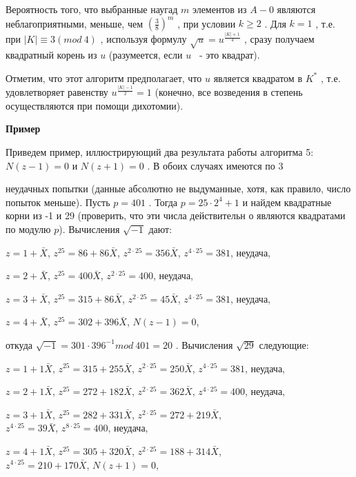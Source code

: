 Вероятность того, что выбранные наугад $m$
 элементов из $A - {0}$
 являются неблагоприятными, меньше, чем $(\frac 38)^m$
 , при условии $k\geqslant 2$
. Для $k = 1$
, т.е. при $|K|\equiv 3 (mod \ 4)$
, используя формулу $\sqrt u = u^{\frac{|K|+1}{4}}$
, сразу получаем квадратный корень из $u$
 (разумеется, если $u$
 ~- это квадрат).

Отметим, что этот алгоритм предполагает, что $u$
 является квадратом в $K^*$
 , т.е. удовлетворяет равенству $u^{\frac{|K|-1}{2}} = 1$
 (конечно, все возведения в степень осуществляются при помощи дихотомии).


{\bf Пример}

Приведем пример, иллюстрирующий два результата работы алгоритма 5: $N(z-1)=0$ и $N(z+1)=0$
. В обоих случаях имеются по 3

\newpage

неудачных попытки (данные абсолютно не выдуманные, хотя, как правило, число попыток меньше). Пусть $p = 401$
. Тогда $p = 25\cdot 2^4 +1$
 и найдем квадратные корни из -1 и 29 (проверить, что эти числа действительн о являются квадратами по модулю $p$). Вычисления $\sqrt{-1}$
 дают:

\begin{center}
$z = 1 +\bar X$, $z^{25}=86+86\bar X$, $z^{2\cdot 25}=356\bar X$,
$z^{4\cdot 25}=381$, неудача,

$z = 2+\bar X$, $z^{25}=400\bar X$, $z^{2\cdot 25}=400$, неудача,

$z = 3+\bar X$, $z^{25}=315+86\bar X$, $z^{2\cdot 25}=45\bar X$, $z^{4\cdot 25}=381$, неудача,

$z=4+\bar X$, $z^{25}=302+396\bar X$, $N(z-1)=0$,
\end{center}


откуда $\sqrt{-1} = 301\cdot 396^{-1} mod \ 401 = 20 $
. Вычисления $\sqrt{29}$
 следующие:

\begin{center}

$z = 1 +1\bar X$, $z^{25}=315+255\bar X$, $z^{2\cdot 25}=250\bar X$,
$z^{4\cdot 25}=381$, неудача,

$z = 2+1\bar X$, $z^{25}=272+182\bar X$, $z^{2\cdot 25}=362\bar X$, $z^{4\cdot 25}=400$, неудача,

$z = 3+1\bar X$, $z^{25}=282+331\bar X$, $z^{2\cdot 25}=272+219\bar X$,\\ $z^{4\cdot 25}=39\bar X$, $z^{8\cdot 25}=400$, неудача,

$z=4+1\bar X$, $z^{25}=305+320\bar X$, $z^{2\cdot 25}=188+314\bar X$,\\ $z^{4\cdot 25}=210+170\bar X$, $N(z+1)=0$,

\end{center}


